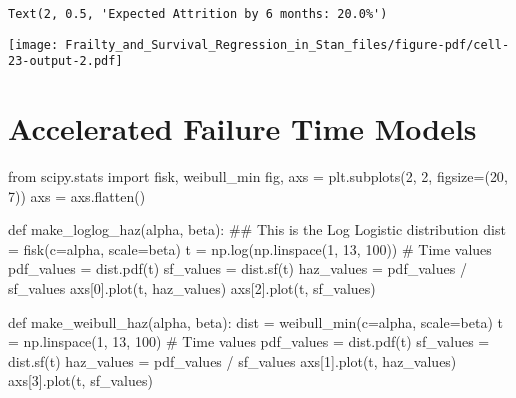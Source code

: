 \documentclass[
  letterpaper,
  DIV=11,
  numbers=noendperiod]{scrartcl}
\newenvironment{Shaded}{\begin{snugshade}}{\end{snugshade}}
\newcommand{\CommentTok}[1]{\textcolor[rgb]{0.37,0.37,0.37}{#1}}
\newcommand{\DecValTok}[1]{\textcolor[rgb]{0.68,0.00,0.00}{#1}}
\newcommand{\ImportTok}[1]{\textcolor[rgb]{0.00,0.46,0.62}{#1}}
\newcommand{\KeywordTok}[1]{\textcolor[rgb]{0.00,0.23,0.31}{#1}}
\newcommand{\NormalTok}[1]{\textcolor[rgb]{0.00,0.23,0.31}{#1}}
\newcommand{\OperatorTok}[1]{\textcolor[rgb]{0.37,0.37,0.37}{#1}}
\begin{document}
\begin{verbatim}
Text(2, 0.5, 'Expected Attrition by 6 months: 20.0%')
\end{verbatim}

\texttt{[image: Frailty\_and\_Survival\_Regression\_in\_Stan\_files/figure-pdf/cell-23-output-2.pdf]}

\section{Accelerated Failure Time
Models}\label{accelerated-failure-time-models}

\begin{Shaded}
\begin{Highlighting}[]
\ImportTok{from}\NormalTok{ scipy.stats }\ImportTok{import}\NormalTok{ fisk, weibull\_min}
\NormalTok{fig, axs }\OperatorTok{=}\NormalTok{ plt.subplots(}\DecValTok{2}\NormalTok{, }\DecValTok{2}\NormalTok{, figsize}\OperatorTok{=}\NormalTok{(}\DecValTok{20}\NormalTok{, }\DecValTok{7}\NormalTok{))}
\NormalTok{axs }\OperatorTok{=}\NormalTok{ axs.flatten()}


\KeywordTok{def}\NormalTok{ make\_loglog\_haz(alpha, beta):}
    \CommentTok{\#\# This is the Log Logistic distribution}
\NormalTok{    dist }\OperatorTok{=}\NormalTok{ fisk(c}\OperatorTok{=}\NormalTok{alpha, scale}\OperatorTok{=}\NormalTok{beta)}
\NormalTok{    t }\OperatorTok{=}\NormalTok{ np.log(np.linspace(}\DecValTok{1}\NormalTok{, }\DecValTok{13}\NormalTok{, }\DecValTok{100}\NormalTok{))  }\CommentTok{\# Time values}
\NormalTok{    pdf\_values }\OperatorTok{=}\NormalTok{ dist.pdf(t)}
\NormalTok{    sf\_values }\OperatorTok{=}\NormalTok{ dist.sf(t)}
\NormalTok{    haz\_values }\OperatorTok{=}\NormalTok{ pdf\_values }\OperatorTok{/}\NormalTok{ sf\_values}
\NormalTok{    axs[}\DecValTok{0}\NormalTok{].plot(t, haz\_values)}
\NormalTok{    axs[}\DecValTok{2}\NormalTok{].plot(t, sf\_values)}


\KeywordTok{def}\NormalTok{ make\_weibull\_haz(alpha, beta):}
\NormalTok{    dist }\OperatorTok{=}\NormalTok{ weibull\_min(c}\OperatorTok{=}\NormalTok{alpha, scale}\OperatorTok{=}\NormalTok{beta)}
\NormalTok{    t }\OperatorTok{=}\NormalTok{ np.linspace(}\DecValTok{1}\NormalTok{, }\DecValTok{13}\NormalTok{, }\DecValTok{100}\NormalTok{)  }\CommentTok{\# Time values}
\NormalTok{    pdf\_values }\OperatorTok{=}\NormalTok{ dist.pdf(t)}
\NormalTok{    sf\_values }\OperatorTok{=}\NormalTok{ dist.sf(t)}
\NormalTok{    haz\_values }\OperatorTok{=}\NormalTok{ pdf\_values }\OperatorTok{/}\NormalTok{ sf\_values}
\NormalTok{    axs[}\DecValTok{1}\NormalTok{].plot(t, haz\_values)}
\NormalTok{    axs[}\DecValTok{3}\NormalTok{].plot(t, sf\_values)}



\end{Highlighting}
\end{Shaded}
\end{document}
